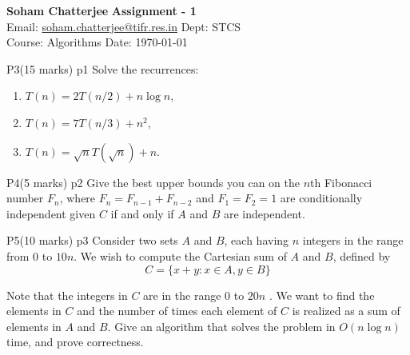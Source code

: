 \documentclass[a4paper, 11pt]{article}
\begin{document}
	
	
	\textsf{\noindent \large\textbf{Soham Chatterjee} \hfill \textbf{Assignment - 1}\\
		Email: \href{soham.chatterjee@tifr.res.in}{soham.chatterjee@tifr.res.in} \hfill Dept: STCS\\
		\normalsize Course: Algorithms \hfill Date: \today}
	
	
\begin{problem}{%
		P3\hfill  (15 marks)
	}{p1%
}
Solve the recurrences: \begin{enumerate}[label=(\roman*)]
	\item $T(n)=2 T(n / 2)+n \log n$, 
	\item $T(n)=7 T(n / 3)+n^2$, 
	\item $T(n)=\sqrt{n} T(\sqrt{n})+n$.
\end{enumerate}

\end{problem}
\solve{	
}

\begin{problem}{%
		P4\hfill  (5 marks)
	}{p2%
	}
 Give the best upper bounds you can on the $n$th Fibonacci number $F_n$, where $F_n=F_{n-1}+F_{n-2}$ and $F_1=F_2=1$ are conditionally independent given $C$ if and only if $A$ and $B$ are independent.
\end{problem}
\solve{	
}


\begin{problem}{%
		P5\hfill  (10 marks)
	}{p3%
	}
Consider two sets $A$ and $B$, each having $n$ integers in the range from 0 to $10 n$. We wish to compute the Cartesian sum of $A$ and $B$, defined by
$$
C=\{x+y: x \in A, y \in B\}
$$

Note that the integers in $C$ are in the range $0$ to $20n$ . We want to find the elements in $C$ and the number of times each element of $C$ is realized as a sum of elements in $A$ and $B$. Give an algorithm that solves the problem in $O(n \log n)$ time, and prove correctness.

\end{problem}
\solve{
}
\end{document}
